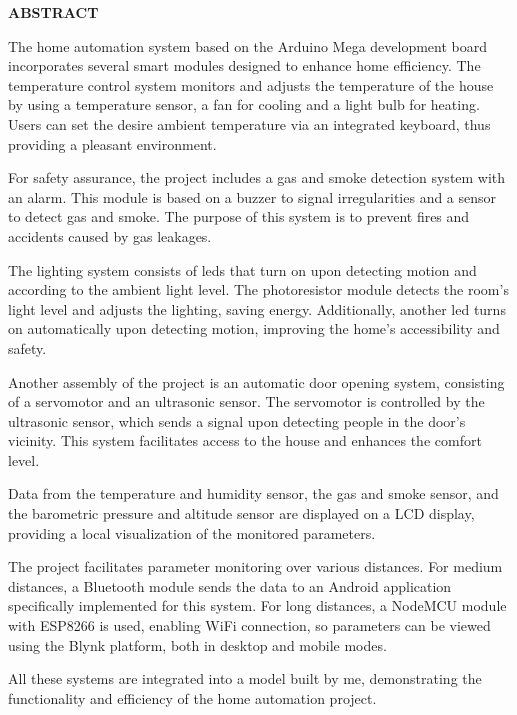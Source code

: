 \thispagestyle{abstractpagestyle}

\vspace*{36pt}

\begin{center}
    \textbf{\fontsize{20pt}{24pt} \selectfont ABSTRACT}
\end{center}

\vspace{24pt}

The home automation system based on the Arduino Mega development board incorporates several smart modules designed to enhance home efficiency. The temperature control system monitors and adjusts the temperature of the house by using a temperature sensor, a fan for cooling and a light bulb for heating. Users can set the desire ambient temperature via an integrated keyboard, thus providing a pleasant environment.

For safety assurance, the project includes a gas and smoke detection system with an alarm. This module is based on a buzzer to signal irregularities and a sensor to detect gas and smoke. The purpose of this system is to prevent fires and accidents caused by gas leakages.

The lighting system consists of leds that turn on upon detecting motion and according to the ambient light level. The photoresistor module detects the room's light level and adjusts the lighting, saving energy. Additionally, another led turns on automatically upon detecting motion, improving the home's accessibility and safety.

Another assembly of the project is an automatic door opening system, consisting of a servomotor and an ultrasonic sensor. The servomotor is controlled by the ultrasonic sensor, which sends a signal upon detecting people in the door's vicinity. This system facilitates access to the house and enhances the comfort level.

Data from the temperature and humidity sensor, the gas and smoke sensor, and the barometric pressure and altitude sensor are displayed on a LCD display, providing a local visualization of the monitored parameters.

The project facilitates parameter monitoring over various distances. For medium distances, a Bluetooth module sends the data to an Android application specifically implemented for this system. For long distances, a NodeMCU module with ESP8266 is used, enabling WiFi connection, so parameters can be viewed using the Blynk platform, both in desktop and mobile modes.

All these systems are integrated into a model built by me, demonstrating the functionality and efficiency of the home automation project.

\vfill